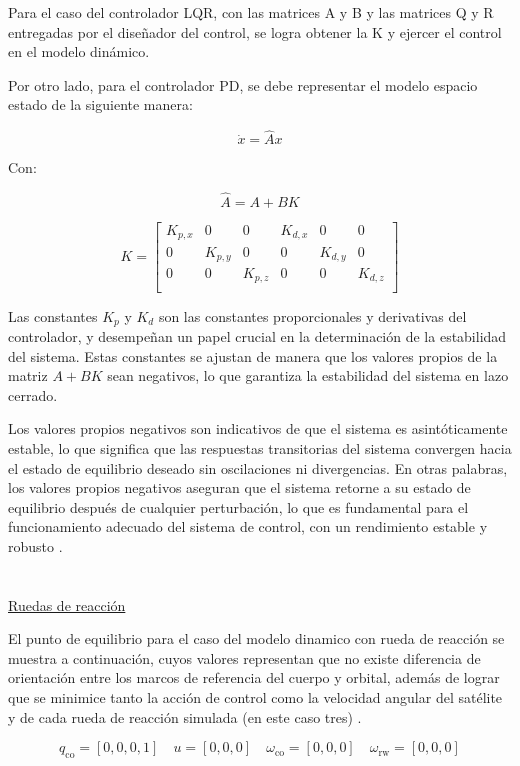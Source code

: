 Para el caso del controlador LQR, con las matrices A y B y las matrices Q y R entregadas por el diseñador del control, se logra obtener la \gls{K} y ejercer el control en el modelo dinámico.

Por otro lado, para el controlador PD, se debe representar el modelo espacio estado de la siguiente manera:

\[
	\dot{x} = \hat{A} x
\]

Con: 

\[
	\hat{A} = A + BK
\]

\[
	K = \begin{bmatrix}
		K_{p,x} & 0 & 0 & K_{d,x} & 0 & 0 \\
		0 & K_{p,y} & 0 & 0 & K_{d,y} & 0 \\
		0 & 0 & K_{p,z} & 0 & 0 & K_{d,z} \\
		
	\end{bmatrix}
\]

Las constantes \(K_p\) y \(K_d\) son las constantes proporcionales y derivativas del controlador, y desempeñan un papel crucial en la determinación de la estabilidad del sistema. Estas constantes se ajustan de manera que los valores propios de la matriz \(A + BK\) sean negativos, lo que garantiza la estabilidad del sistema en lazo cerrado.

Los valores propios negativos son indicativos de que el sistema es asintóticamente estable, lo que significa que las respuestas transitorias del sistema convergen hacia el estado de equilibrio deseado sin oscilaciones ni divergencias. En otras palabras, los valores propios negativos aseguran que el sistema retorne a su estado de equilibrio después de cualquier perturbación, lo que es fundamental para el funcionamiento adecuado del sistema de control, con un rendimiento estable y robusto \cite{ref43}.
\\
\\
\\ 
\underline{Ruedas de reacción}

El punto de equilibrio para el caso del modelo dinamico con rueda de reacción se muestra a continuación, cuyos valores representan que no existe diferencia de orientación entre los marcos de referencia del cuerpo y orbital, además de lograr que se minimice tanto la acción de control como la velocidad angular del satélite y de cada rueda de reacción simulada (en este caso tres) \cite{ref41}.

\[
q_{\text{co}} = [0, 0, 0, 1] \quad u = [0, 0, 0] \quad 	\omega_{\text{co}} = [0, 0, 0] \quad 	\omega_{\text{rw}} = [0, 0, 0]
\]



